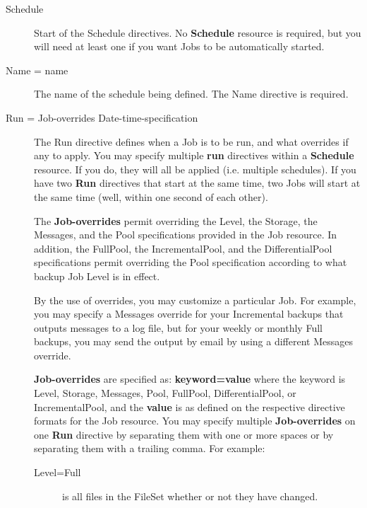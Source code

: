 \begin{description}

\item [Schedule]
   Start of the Schedule directives. No {\bf Schedule}  resource is required, but
you will need at least one if you want  Jobs to be automatically started. 

\item [Name = \lt{}name\gt{}]
   The name of the schedule being defined.  The Name directive is required. 

\item [Run = \lt{}Job-overrides\gt{} \lt{}Date-time-specification\gt{}]
   The Run directive defines when a Job is to be run,  and what overrides if any
to apply. You may specify multiple  {\bf run} directives within a {\bf
Schedule} resource. If you  do, they will all be applied (i.e. multiple
schedules). If you  have two {\bf Run} directives that start at the same time,
two  Jobs will start at the same time (well, within one second of  each
other).  

The {\bf Job-overrides} permit overriding the Level, the  Storage, the
Messages, and the Pool specifications  provided in the Job resource. In
addition, the  FullPool, the IncrementalPool, and the  DifferentialPool
specifications permit overriding the  Pool specification according to what
backup Job Level is  in effect.  

By the use of overrides, you  may customize a particular Job. For example, you
may specify a  Messages override for your Incremental backups that  outputs
messages to a log file, but for your weekly or monthly  Full backups, you may
send the output by email by using  a different Messages override.  

{\bf Job-overrides} are specified as:  {\bf keyword=value} where the keyword
is Level, Storage,  Messages, Pool, FullPool, DifferentialPool, or
IncrementalPool, and  the {\bf value} is as defined on the respective
directive formats for  the Job resource. You may specify multiple {\bf
Job-overrides} on  one {\bf Run} directive by separating them with one or more
spaces or  by separating them with a trailing comma.  For example:  

\begin{description}

\item [Level=Full]
   is all files in the FileSet whether or not  they have changed.  


\end{description}
\end{description}
